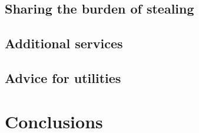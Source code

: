 \documentclass{article}
\begin{document}
\listoftodos

\subsection{Sharing the burden of stealing}

\subsection{Additional services}

\subsection{Advice for utilities}

\section{Conclusions}
\end{document}
